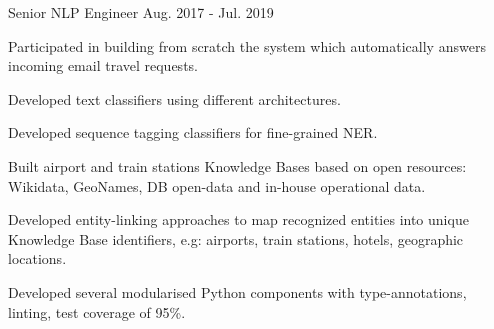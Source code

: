 \begin{cventries}
  \cventry
    {Senior NLP Engineer}
    {} %
    {} %
    {Aug. 2017 - Jul. 2019} %
    {
      \begin{cvitems}
		\item {Participated in building from scratch the system which automatically answers incoming email travel requests.}
		\item {Developed text classifiers using different architectures.}
		\item {Developed sequence tagging classifiers for fine-grained NER.}
		\item {Built airport and train stations Knowledge Bases based on open resources: Wikidata, GeoNames, DB open-data and in-house operational data.}
		\item {Developed entity-linking approaches to map recognized entities into unique Knowledge Base identifiers, e.g: airports, train stations, hotels, geographic locations.}
		\item {Developed several modularised Python components with type-annotations, linting, test coverage of 95\%.}
        \end{cvitems}
 	}




\begin{comment}
  \cventry
    {Lead NLP Engineer} %
    {Comtravo GmbH} %
    {Berlin, Germany} %
    {Aug. 2017 - Apr. 2022} %
	{
      \begin{cvitems} %
		\item {Joined as an NLP Engineer in August 2017, was promoted to Senior NLP Engineer in July 2019, and in June 2021 to Lead NLP Engineer.}
        \item {Led a team of 3 developers + 4 annotators, working on the system that automatically answers incoming email travel requests and assists travel agents in handling them. Coordinating development tasks based on system performance and feature requests.}
        \item {Trained, evaluated and improved different models for text classification and fine-grained NER, increasing the performance of identifying specific booking requests and performing information extraction to automatically fulfil booking requests.}
		\item {Developed algorithms to map input text into unique Knowledge Base identifiers, e.g: airports, train stations, hotels, geographic locations.}		
      \end{cvitems}
    }
\end{comment}





\end{cventries}
